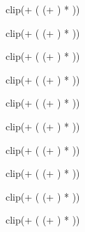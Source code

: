 \FPeval{\DndInvestigationMod}
{clip(\DndIntMod + (
	(\DndIsProficientInvestigation + \DndIsExpertiseInvestigation)
		 * \DndProficiencyMod))}

\FPeval{\DndMedicineMod}
{clip(\DndWisMod + (
	(\DndIsProficientMedicine + \DndIsExpertiseMedicine)
		 * \DndProficiencyMod))}

\FPeval{\DndNatureMod}
{clip(\DndIntMod + (
	(\DndIsProficientNature + \DndIsExpertiseNature)
		 * \DndProficiencyMod))}

\FPeval{\DndPerceptionMod}
{clip(\DndWisMod + (
	(\DndIsProficientPerception + \DndIsExpertisePerception)
		 * \DndProficiencyMod))}

\FPeval{\DndPerformanceMod}
{clip(\DndChaMod + (
	(\DndIsProficientPerformance + \DndIsExpertisePerformance)
		 * \DndProficiencyMod))}

\FPeval{\DndPersuasionMod}
{clip(\DndChaMod + (
	(\DndIsProficientPersuasion + \DndIsExpertisePersuasion)
		 * \DndProficiencyMod))}

\FPeval{\DndReligionMod}
{clip(\DndIntMod + (
	(\DndIsProficientReligion + \DndIsExpertiseReligion)
		 * \DndProficiencyMod))}

\FPeval{\DndSlightOfHandMod}
{clip(\DndDexMod + (
	(\DndIsProficientSlightOfHand + \DndIsExpertiseSlightOfHand)
		 * \DndProficiencyMod))}

\FPeval{\DndStealthMod}
{clip(\DndDexMod + (
	(\DndIsProficientStealth + \DndIsExpertiseStealth)
		 * \DndProficiencyMod))}

\FPeval{\DndSurvivalMod}
{clip(\DndWisMod + (
	(\DndIsProficientSurvival + \DndIsExpertiseSurvival)
		 * \DndProficiencyMod))}




\ifthenelse{\isundefined{\DndArcaneTricksterLevel}}
	{}{}
